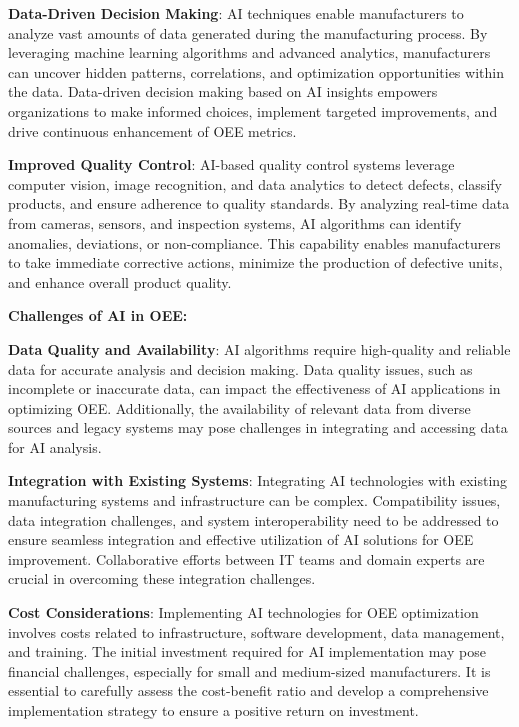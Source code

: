 \documentclass[12pt]{article}
\begin{document}
\textbf{Data-Driven Decision Making}: AI techniques enable manufacturers to analyze vast amounts of data generated during the manufacturing process. By leveraging machine learning algorithms and advanced analytics, manufacturers can uncover hidden patterns, correlations, and optimization opportunities within the data. Data-driven decision making based on AI insights empowers organizations to make informed choices, implement targeted improvements, and drive continuous enhancement of OEE metrics.
\vspace{0.3cm}

\textbf{Improved Quality Control}: AI-based quality control systems leverage computer vision, image recognition, and data analytics to detect defects, classify products, and ensure adherence to quality standards. By analyzing real-time data from cameras, sensors, and inspection systems, AI algorithms can identify anomalies, deviations, or non-compliance. This capability enables manufacturers to take immediate corrective actions, minimize the production of defective units, and enhance overall product quality.
\vspace{0.3cm}

\textbf{Challenges of AI in OEE:}
\vspace{0.3cm}

\textbf{Data Quality and Availability}: AI algorithms require high-quality and reliable data for accurate analysis and decision making. Data quality issues, such as incomplete or inaccurate data, can impact the effectiveness of AI applications in optimizing OEE. Additionally, the availability of relevant data from diverse sources and legacy systems may pose challenges in integrating and accessing data for AI analysis.
\vspace{0.3cm}

\textbf{Integration with Existing Systems}: Integrating AI technologies with existing manufacturing systems and infrastructure can be complex. Compatibility issues, data integration challenges, and system interoperability need to be addressed to ensure seamless integration and effective utilization of AI solutions for OEE improvement. Collaborative efforts between IT teams and domain experts are crucial in overcoming these integration challenges.
\vspace{0.3cm}

\textbf{Cost Considerations}: Implementing AI technologies for OEE optimization involves costs related to infrastructure, software development, data management, and training. The initial investment required for AI implementation may pose financial challenges, especially for small and medium-sized manufacturers. It is essential to carefully assess the cost-benefit ratio and develop a comprehensive implementation strategy to ensure a positive return on investment.
\vspace{0.3cm}
\end{document}
